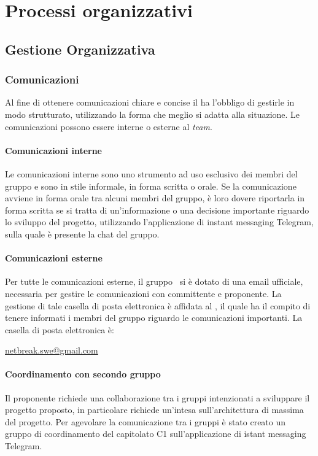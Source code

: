 \newpage

\section{Processi organizzativi}

	\subsection{Gestione Organizzativa}
		
		\subsubsection{Comunicazioni}
		Al fine di ottenere comunicazioni chiare e concise il \textit{\RdP} ha l'obbligo di gestirle in modo strutturato, utilizzando la forma che meglio si adatta alla situazione. Le comunicazioni possono essere interne o esterne al \textit{team}.
			
			\paragraph{Comunicazioni interne}
			Le comunicazioni interne sono uno strumento ad uso esclusivo dei membri del gruppo e sono in stile informale, in forma scritta o orale. 
			Se la comunicazione avviene in forma orale tra alcuni membri del gruppo, è loro dovere riportarla in forma scritta se si tratta di un'informazione o una decisione importante riguardo lo sviluppo del progetto, utilizzando l’applicazione di instant messaging\ped{G} Telegram, sulla quale è presente la chat del gruppo.

			\paragraph{Comunicazioni esterne}
			Per tutte le comunicazioni esterne, il gruppo \gruppo\ si è dotato di una email ufficiale, necessaria per gestire le comunicazioni con committente e proponente. La gestione di tale casella di posta elettronica è affidata al \textit{\RdP}, il quale ha il compito di tenere informati i membri del gruppo riguardo le comunicazioni importanti. La casella di posta elettronica è:
			\begin{center}
				\url{netbreak.swe@gmail.com} 
			\end{center}
		\paragraph{Coordinamento con secondo gruppo}
			Il proponente richiede una collaborazione tra i gruppi intenzionati a sviluppare il progetto proposto, in particolare \proponente richiede un'intesa sull'architettura di massima del progetto. Per agevolare la comunicazione tra i gruppi è stato creato un gruppo di coordinamento del capitolato C1 sull'applicazione di istant messaging Telegram.
			
